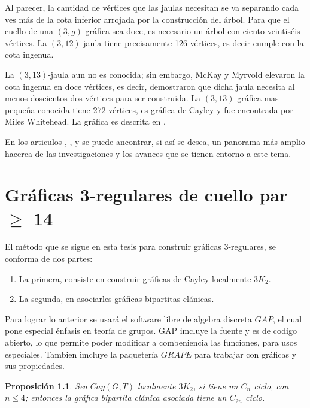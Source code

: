 \documentclass[12pt]{book}
\newtheorem{proposition}{Proposición}
\theoremstyle{definition}
\begin{document}
Al parecer, la cantidad de vértices que las jaulas necesitan se va
separando cada ves más de la cota inferior arrojada por la
construcción del árbol. Para que el cuello de una $(3,g)$-gráfica sea
doce, es necesario un árbol con ciento veintiséis vértices. La
$(3,12)$-jaula tiene precisamente 126 vértices, es decir cumple con la
cota ingenua.


La $(3,13)$-jaula aun no es conocida; sin embargo, McKay y Myrvold
elevaron la cota ingenua en doce vértices, es decir, demostraron que
dicha jaula necesita al menos doscientos dos vértices para ser
construida. La $(3,13)$-gráfica mas pequeña conocida tiene $272$
vértices, es gráfica de Cayley y fue encontrada por Miles
Whitehead. La gráfica es descrita en \cite{cgcuellogrande}. 


En los articulos \cite{Asurvey}, \cite{Exoo}, \cite{cgcuellogrande} y
\cite{cubicasconcuellogrande} se puede ancontrar, si así se desea, un
panorama más amplio hacerca de las investigaciones y los avances que
se tienen entorno a este tema.

\chapter{Gráficas 3-regulares de cuello par $\geq$ 14}

El método que se sigue en esta tesis para construir gráficas
3-regulares, se conforma de dos partes:

\begin{enumerate}
\item La primera, consiste en
construir gráficas de Cayley localmente $3K_2$.
\item La segunda, en asociarles gráficas bipartitas
clánicas.
\end{enumerate}

 Para lograr lo anterior se usará el software libre de algebra
 discreta $GAP$, el cual pone especial énfasis en teoría de grupos. GAP
 imcluye la fuente y es de codigo abierto, lo que permite poder
 modificar a combeniencia las funciones, para usos especiales. Tambien
 imcluye la paquetería $GRAPE$ para trabajar con gráficas y sus
 propiedades. 



\begin{proposition}\label{2nciclo}
  Sea $Cay(G,T)$ localmente $3K_2$, si tiene un $C_n$ ciclo, con $n\le
  4$; entonces la gráfica bipartita clánica asociada tiene un $C_{2n}$
  ciclo.
\end{proposition}
\end{document}
